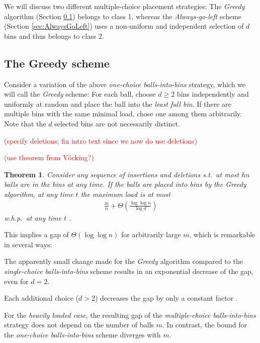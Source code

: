 \documentclass[a4paper,12pt]{article}
\newcommand\todo[1]{\textcolor{red}{(#1)}}
\newtheorem{theorem}{Theorem}
\begin{document}
We will discuss two different multiple-choice placement strategies: The \emph{Greedy} algorithm (Section \ref{sec:greedy}) belongs to class 1, whereas the \emph{Always-go-left} scheme (Section \ref{sec:AlwaysGoLeft}) uses a non-uniform and independent selection of $d$ bins and thus belongs to class 2.

\subsection{The Greedy scheme}
\label{sec:greedy}

Consider a variation of the above \emph{one-choice balls-into-bins} strategy, which we will call the \emph{Greedy} scheme: For each ball, choose $d \geq 2$ bins independently and uniformly at random and place the ball into the \emph{least full bin}. If there are multiple bins with the same minimal load, chose one among them arbitrarily. Note that the $d$ selected bins are not necessarily distinct. 

\todo{specify deletions; fix intro text since we now do use deletions}

\todo{use theorem from V\"ocking?}

\begin{theorem}
\label{theorem:greedy}
Consider any sequence of insertions and deletions s.t.~at most $hn$ balls are in the bins at any time. If the balls are placed into bins by the Greedy algorithm, at any time $t$ the maximum load is at most 
\begin{align}
\frac{m}{n} + \Theta\left(\frac{\log \log n}{\log d} \right)
\end{align}
w.h.p.~at any time $t$ \cite{ABKU99} \cite{BCSV06}.

\end{theorem}

This implies a gap of $\Theta\left(\log \log n \right)$ for arbitrarily large $m$, which is remarkable in several ways:
\begin{compactitem}
\item The apparently small change made for the \emph{Greedy} algorithm compared to the \emph{single-choice balls-into-bins} scheme results in an exponential decrease of the gap, even for $d=2$. 
\item Each additional choice ($d > 2$) decreases the gap by only a constant factor \cite{MRS01}. 
\item For the \emph{heavily loaded case}, the resulting gap of the \emph{multiple-choice balls-into-bins} strategy does not depend on the number of balls $m$. In contrast, the bound for the \emph{one-choice balls-into-bins} scheme diverges with $m$.
\begin{comment}
\todo{the following is only true for class 1 algorithms}
\item The given bounds are \emph{tight}, meaning that no other strategy that places each ball into one of $d$ randomly selected bins achieves a gap that is asymptotically lower.
\end{comment}
\end{compactitem}
\end{document}
